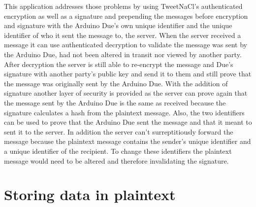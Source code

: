 This application addresses those problems by using TweetNaCl's authenticated encryption as well as a signature and prepending the messages before encryption and signature with the Arduino Due's own unique identifier and the unique identifier of who it sent the message to, the server. When the server received a message it can use authenticated decryption to validate the message was sent by the Arduino Due, had not been altered in transit nor viewed by another party. After decryption the server is still able to re-encrypt the message and Due's signature with another party's public key and send it to them and still prove that the message was originally sent by the Arduino Due. With the addition of signature another layer of security is provided as the server can prove again that the message sent by the Arduino Due is the same as received because the signature calculates a hash from the plaintext message. Also, the two identifiers can be used to prove that the Arduino Due sent the message and that it meant to sent it to the server. In addition the server can't surreptitiously forward the message because the plaintext message contains the sender's unique identifier and a unique identifier of the recipient. To change these identifiers the plaintext message would need to be altered and therefore invalidating the signature.





\section{Storing data in plaintext}

